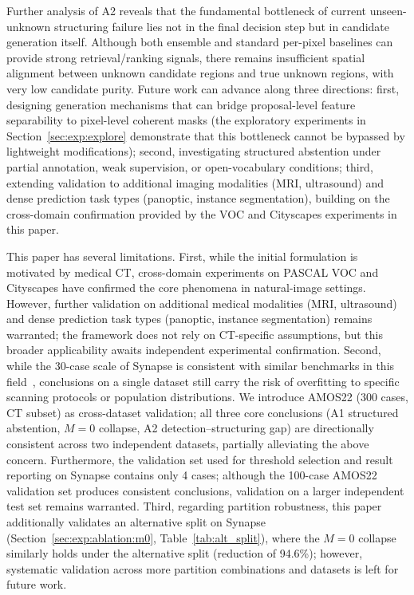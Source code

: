 \documentclass[3p,twocolumn,authoryear]{elsarticle}
\begin{document}
Further analysis of A2 reveals that the fundamental bottleneck of current
unseen-unknown structuring failure lies not in the final decision step but in candidate
generation itself. Although both ensemble and standard per-pixel baselines can provide
strong retrieval/ranking signals, there remains insufficient spatial alignment between
unknown candidate regions and true unknown regions, with very low candidate purity.
Future work can advance along three directions: first, designing generation mechanisms
that can bridge proposal-level feature separability to pixel-level coherent masks (the
exploratory experiments in Section~\ref{sec:exp:explore} demonstrate that this bottleneck
cannot be bypassed by lightweight modifications); second, investigating structured
abstention under partial annotation, weak supervision, or open-vocabulary conditions;
third, extending validation to additional imaging modalities (MRI, ultrasound) and
dense prediction task types (panoptic, instance segmentation), building on the
cross-domain confirmation provided by the VOC and Cityscapes experiments in this paper.

This paper has several limitations.
First, while the initial formulation is motivated by medical CT, cross-domain experiments
on PASCAL VOC and Cityscapes have confirmed the core phenomena in natural-image settings.
However, further validation on additional medical modalities (MRI, ultrasound) and
dense prediction task types (panoptic, instance segmentation) remains warranted;
the framework does not rely on CT-specific assumptions, but this broader applicability
awaits independent experimental confirmation.
Second, while the 30-case scale of Synapse is consistent with similar benchmarks in this
field~\cite{chen2021transunet,cao2022swinunet}, conclusions on a single dataset still
carry the risk of overfitting to specific scanning protocols or population distributions.
We introduce AMOS22 (300 cases, CT subset) as cross-dataset validation; all three core
conclusions (A1 structured abstention, $M=0$ collapse, A2 detection--structuring gap)
are directionally consistent across two independent datasets, partially alleviating the
above concern.
Furthermore, the validation set used for threshold selection and result reporting on
Synapse contains only 4 cases; although the 100-case AMOS22 validation set produces
consistent conclusions, validation on a larger independent test set remains warranted.
Third, regarding partition robustness, this paper additionally validates an alternative
split on Synapse (Section~\ref{sec:exp:ablation:m0}, Table~\ref{tab:alt_split}), where
the $M=0$ collapse similarly holds under the alternative split (reduction of 94.6\%);
however, systematic validation across more partition combinations and datasets is left
for future work.
\end{document}
